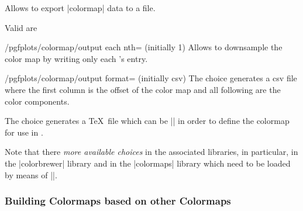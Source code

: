\begin{command}{\pgfplotscolormaptodatafile{}}
	Allows to export |colormap| data to a file.
\begin{codeexample}[]
\end{codeexample}

\begin{codeexample}[]
\end{codeexample}
	
	Valid  are
	\begin{pgfplotskey}{/pgfplots/colormap/output each nth= (initially 1)}
		Allows to downsample the color map by writing only each 's entry.
	\end{pgfplotskey}
	\begin{pgfplotskey}{/pgfplots/colormap/output format= (initially csv)}
		The choice  generates a csv file where the first column is the offset of the color map and all following are the color components.

		The choice  generates a \TeX\ file which can be || in order to define the colormap for use in \PGFPlots.
	\end{pgfplotskey}
\end{command}


Note that there \emph{more available choices} in the associated libraries, in particular, in the |colorbrewer| library and in the |colormaps| library which need to be loaded by means of ||.

\subsubsection{Building Colormaps based on other Colormaps}
\label{sec:pgfplots:colormaps:based:on:others}

